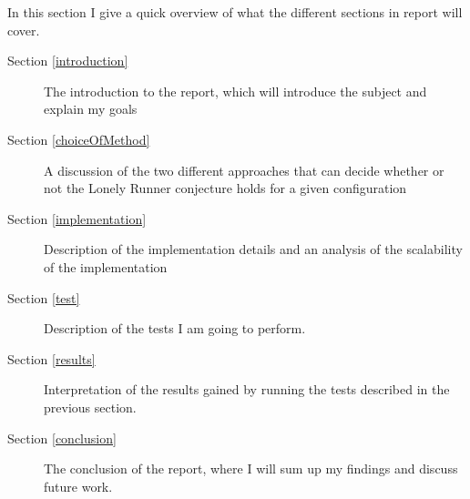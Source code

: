 In this section I give a quick overview of what the different sections in report will cover.
\begin{description}
\item[Section \ref{introduction}] The introduction to the report, which will introduce the subject and explain my goals
\item[Section \ref{choiceOfMethod}] A discussion of the two different approaches that can decide whether or not the Lonely Runner conjecture holds for a given configuration
\item[Section \ref{implementation}] Description of the implementation details and an analysis of the scalability of the implementation
\item[Section \ref{test}] Description of the tests I am going to perform.
\item[Section \ref{results}] Interpretation of the results gained by running the tests described in the previous section.
\item[Section \ref{conclusion}] The conclusion of the report, where I will sum up my findings and discuss future work.
\end{description}
